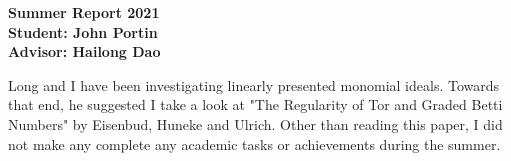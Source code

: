 \documentclass[letter,12pt]{article}
\begin{document}
\begin{center}
\bf{\Large{Summer Report 2021}} \\
Student: John Portin \\
Advisor: Hailong Dao
\end{center}


Long and I have been investigating linearly presented monomial ideals. Towards that end, he suggested I take a look at "The Regularity of Tor and Graded Betti Numbers" by Eisenbud, Huneke and Ulrich. Other than reading this paper, I did not make any complete any academic tasks or achievements during the summer.
\end{document}
